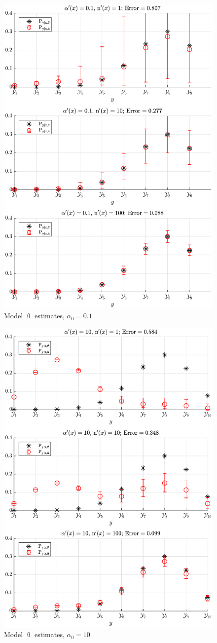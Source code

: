 \documentclass[12pt]{report}
\begin{document}
\begin{figure}
\centering
\includegraphics[width=0.7\linewidth]{P_yx_error_a0_0_1.pdf}
\caption{Model $\uptheta$ estimates, $\alpha_0 = 0.1$}
\label{fig:P_yx_error_a0_0_1}
\end{figure}

\begin{figure}
\centering
\includegraphics[width=0.7\linewidth]{P_yx_error_a0_10.pdf}
\caption{Model $\uptheta$ estimates, $\alpha_0 = 10$}
\label{fig:P_yx_error_a0_10}
\end{figure}
\end{document}
